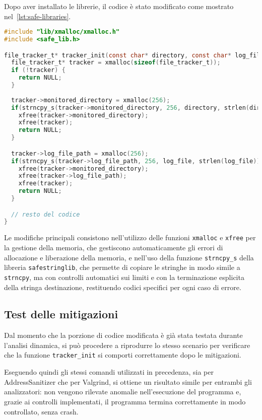 Dopo aver installato le librerie, il codice è stato modificato come mostrato nel~\autoref{lst:safe-libraries}.
\begin{lstlisting}[language=C, caption={Codice mitigato (librerie)}, label={lst:safe-libraries}, style=changes_in_c]
#include "lib/xmalloc/xmalloc.h"
#include <safe_lib.h>

file_tracker_t* tracker_init(const char* directory, const char* log_file) {
  file_tracker_t* tracker = xmalloc(sizeof(file_tracker_t));
  if (!tracker) {
    return NULL;
  }
  
  tracker->monitored_directory = xmalloc(256);
  if(strncpy_s(tracker->monitored_directory, 256, directory, strlen(directory)) != EOK){
    xfree(tracker->monitored_directory);
    xfree(tracker);
    return NULL;
  }

  tracker->log_file_path = xmalloc(256);
  if(strncpy_s(tracker->log_file_path, 256, log_file, strlen(log_file)) != EOK){
    xfree(tracker->monitored_directory);
    xfree(tracker->log_file_path);
    xfree(tracker);
    return NULL;
  }

  // resto del codice
}
\end{lstlisting}

Le modifiche principali consistono nell'utilizzo delle funzioni \texttt{xmalloc}
e \texttt{xfree} per la gestione della memoria, che gestiscono automaticamente
gli errori di allocazione e liberazione della memoria, e nell'uso della funzione
\texttt{strncpy\_s} della libreria \texttt{safestringlib}, che permette di
copiare le stringhe in modo simile a \texttt{strncpy}, ma con controlli
automatici sui limiti e con la terminazione esplicita della stringa destinazione,
restituendo codici specifici per ogni caso di errore.

\subsection*{Test delle mitigazioni}
\label{sec:test-mitigations}

Dal momento che la porzione di codice modificata è già stata testata durante l'analisi
dinamica, si può procedere a riprodurre lo stesso scenario per verificare che la
funzione \texttt{tracker\_init} si comporti correttamente dopo le mitigazioni.

Eseguendo quindi gli stessi comandi utilizzati in precedenza, sia per AddressSanitizer
che per Valgrind, si ottiene un risultato simile per entrambi gli analizzatori: non
vengono rilevate anomalie nell'esecuzione del programma e, grazie ai controlli
implementati, il programma termina correttamente in modo controllato, senza
crash.

